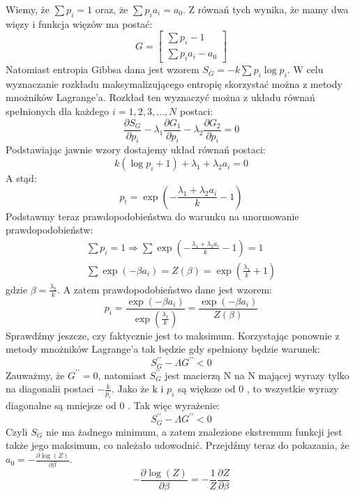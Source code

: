 \documentclass[12pt,a4paper]{article}
\begin{document}
Wiemy, że $\sum p_{i}=1$ oraz, że $\sum p_{i} a_{i}=a_{0}$. Z równań tych wynika, że mamy dwa więzy i funkcja więzów ma postać:
$$
G=\left[\begin{array}{c}
\sum p_{i}-1 \\
\sum p_{i} a_{i}-a_{0}
\end{array}\right]
$$
Natomiast entropia Gibbsa dana jest wzorem $S_{G}=-k \sum p_{i} \log p_{i}$. W celu wyznaczanie rozkładu maksymalizującego entropię skorzystać można z metody mnożników Lagrange'a. Rozkład ten wyznaczyć można z układu równań spełnionych dla każdego $i=1,2,3, \ldots, N$ postaci:
$$
\frac{\partial S_{G}}{\partial p_{i}}-\lambda_{1} \frac{\partial G_{1}}{\partial p_{i}}-\lambda_{2} \frac{\partial G_{2}}{\partial p_{i}}=0
$$
Podstawiając jawnie wzory dostajemy układ równań postaci:
$$
k\left(\log p_{i}+1\right)+\lambda_{1}+\lambda_{2} a_{i}=0
$$
A stąd:
$$
p_{i}=\exp \left(-\frac{\lambda_{1}+\lambda_{2} a_{i}}{k}-1\right)
$$
Podstawmy teraz prawdopodobieństwa do warunku na unormowanie prawdopodobieństw:
$$
\begin{gathered}
\sum p_{i}=1 \Rightarrow \sum \exp \left(-\frac{\lambda_{1}+\lambda_{2} a_{i}}{k}-1\right)=1 \\
\sum \exp \left(-\beta a_{i}\right)=Z(\beta)=\exp \left(\frac{\lambda_{1}}{k}+1\right)
\end{gathered}
$$
gdzie $\beta=\frac{\lambda_{2}}{k}$. A zatem prawdopodobieństwo dane jest wzorem:
$$
p_{i}=\frac{\exp \left(-\beta a_{i}\right)}{\exp \left(\frac{\lambda_{1}}{k}\right)}=\frac{\exp \left(-\beta a_{i}\right)}{Z(\beta)}
$$
Sprawdźmy jeszcze, czy faktycznie jest to maksimum. Korzystając ponownie z metody mnożników Lagrange'a tak będzie gdy spełniony będzie warunek:
$$
S_{G}^{\prime \prime}-\Lambda G^{\prime \prime}<0
$$
Zauważmy, że $G^{\prime \prime}=0$, natomiast $S_{G}^{\prime \prime}$ jest macierzą $\mathrm{N}$ na $\mathrm{N}$ mającej wyrazy tylko na diagonalii postaci $-\frac{k}{p_{i}}$. Jako że $\mathrm{k}$ i $p_{i}$ są większe od 0 , to wszystkie wyrazy diagonalne są mniejsze od 0 . Tak więc wyrażenie:
$$
S_{G}^{\prime \prime}-\Lambda G^{\prime \prime}<0
$$
Czyli $S_{G}$ nie ma żadnego minimum, a zatem znalezione ekstremum funkcji jest także jego maksimum, co należało udowodnić. Przejdźmy teraz do pokazania, że $a_{0}=-\frac{\partial \log (Z)}{\partial \beta}$.
$$
-\frac{\partial \log (Z)}{\partial \beta}=-\frac{1}{Z} \frac{\partial Z}{\partial \beta}
$$
\end{document}
